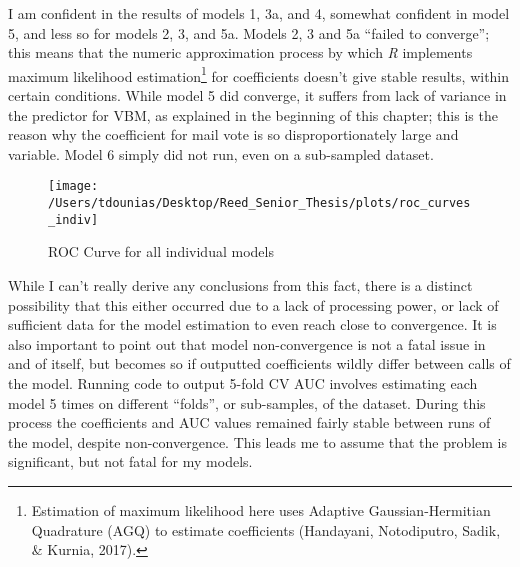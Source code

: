 \documentclass[12pt,twoside]{reedthesis}
\begin{document}
  I am confident in the results of models 1, 3a, and 4, somewhat confident
  in model 5, and less so for models 2, 3, and 5a. Models 2, 3 and 5a
  ``failed to converge''; this means that the numeric approximation
  process by which \textit{R} implements maximum likelihood
  estimation\footnote{Estimation of maximum likelihood here uses Adaptive
    Gaussian-Hermitian Quadrature (AGQ) to estimate coefficients
    (Handayani, Notodiputro, Sadik, \& Kurnia, 2017).} for coefficients
  doesn't give stable results, within certain conditions. While model 5
  did converge, it suffers from lack of variance in the predictor for VBM,
  as explained in the beginning of this chapter; this is the reason why
  the coefficient for mail vote is so disproportionately large and
  variable. Model 6 simply did not run, even on a sub-sampled dataset.
  
  \begin{figure}
  
  {\centering \texttt{[image: /Users/tdounias/Desktop/Reed\_Senior\_Thesis/plots/roc\_curves\_indiv]} 
  
  }
  
  \caption[ROC Curve for all individual models]{ROC Curve for all individual models}\label{fig:roc the curves}
  \end{figure}
  
  While I can't really derive any conclusions from this fact, there is a
  distinct possibility that this either occurred due to a lack of
  processing power, or lack of sufficient data for the model estimation to
  even reach close to convergence. It is also important to point out that
  model non-convergence is not a fatal issue in and of itself, but becomes
  so if outputted coefficients wildly differ between calls of the model.
  Running code to output 5-fold CV AUC involves estimating each model 5
  times on different ``folds'', or sub-samples, of the dataset. During
  this process the coefficients and AUC values remained fairly stable
  between runs of the model, despite non-convergence. This leads me to
  assume that the problem is significant, but not fatal for my models.
  
\end{document}
